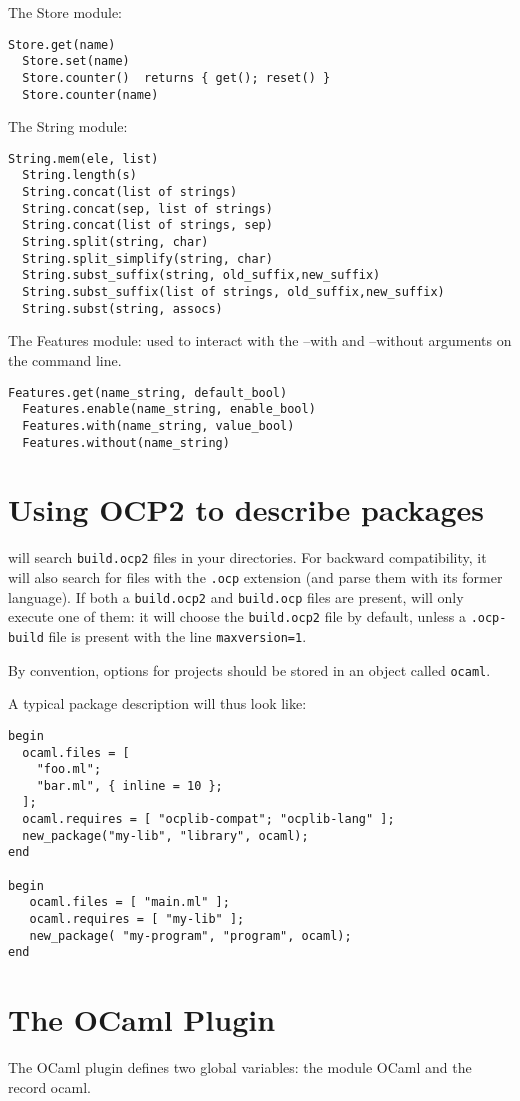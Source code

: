 The {\sf Store} module:
\begin{lstlisting}[language=ocp2]
  Store.get(name)
  Store.set(name)
  Store.counter()  returns { get(); reset() }
  Store.counter(name)
\end{lstlisting}

The {\sf String} module:
\begin{lstlisting}[language=ocp2]
  String.mem(ele, list)
  String.length(s)
  String.concat(list of strings)
  String.concat(sep, list of strings)
  String.concat(list of strings, sep)
  String.split(string, char)
  String.split_simplify(string, char)
  String.subst_suffix(string, old_suffix,new_suffix)
  String.subst_suffix(list of strings, old_suffix,new_suffix)
  String.subst(string, assocs)
\end{lstlisting}

The {\sf Features} module: used to interact with the {\sf --with} and
{\sf --without} arguments on the command line.
\begin{lstlisting}[language=ocp2]
  Features.get(name_string, default_bool)
  Features.enable(name_string, enable_bool)
  Features.with(name_string, value_bool)
  Features.without(name_string)
\end{lstlisting}


\section{Using OCP2 to describe packages}

\ocpbuild{} will search {\tt build.ocp2} files in your
directories. For backward compatibility, it will also search for files
with the {\tt .ocp} extension (and parse them with its former
language). If both a {\tt build.ocp2} and {\tt build.ocp} files are
present, \ocpbuild{} will only execute one of them: it will choose the
{\tt build.ocp2} file by default, unless a {\tt .ocp-build} file is
present with the line {\tt maxversion=1}.

By convention, options for projects should be stored in an object
called {\tt ocaml}.

A typical package description will thus look like:

\begin{verbatim}
begin
  ocaml.files = [
    "foo.ml";
    "bar.ml", { inline = 10 };
  ];
  ocaml.requires = [ "ocplib-compat"; "ocplib-lang" ];
  new_package("my-lib", "library", ocaml);
end

begin
   ocaml.files = [ "main.ml" ];
   ocaml.requires = [ "my-lib" ];
   new_package( "my-program", "program", ocaml);
end
\end{verbatim}

\section{The OCaml Plugin}

The OCaml plugin defines two global variables: the module {\sf OCaml} and
the record {\sf ocaml}.
